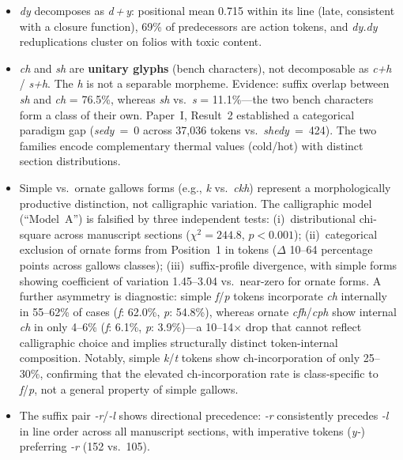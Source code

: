 \documentclass[11pt,a4paper]{article}
\begin{document}
\begin{itemize}[leftmargin=2em]
\item \textit{dy} decomposes as \textit{d\,+\,y}: positional mean 0.715 within its line (late, consistent with a closure function), 69\% of predecessors are action tokens, and \textit{dy.dy} reduplications cluster on folios with toxic content.

\item \textit{ch} and \textit{sh} are \textbf{unitary glyphs} (bench characters), not decomposable as \textit{c+h} / \textit{s+h}. The \textit{h} is not a separable morpheme. Evidence: suffix overlap between \textit{sh} and \textit{ch} = 76.5\%, whereas \textit{sh} vs.\ \textit{s} = 11.1\%---the two bench characters form a class of their own. Paper~I, Result~2 established a categorical paradigm gap (\textit{sedy}~=~0 across 37,036 tokens vs.\ \textit{shedy}~=~424). The two families encode complementary thermal values (cold/hot) with distinct section distributions.

\item Simple vs.\ ornate gallows forms (e.g., \textit{k} vs.\ \textit{ckh}) represent a morphologically productive distinction, not calligraphic variation. The calligraphic model (``Model~A'') is falsified by three independent tests: (i)~distributional chi-square across manuscript sections ($\chi^2 = 244.8$, $p < 0.001$); (ii)~categorical exclusion of ornate forms from Position~1 in tokens ($\Delta$ 10--64 percentage points across gallows classes); (iii)~suffix-profile divergence, with simple forms showing coefficient of variation 1.45--3.04 vs.\ near-zero for ornate forms. A further asymmetry is diagnostic: simple \textit{f}/\textit{p} tokens incorporate \textit{ch} internally in 55--62\% of cases (\textit{f}: 62.0\%, \textit{p}: 54.8\%), whereas ornate \textit{cfh}/\textit{cph} show internal \textit{ch} in only 4--6\% (\textit{f}: 6.1\%, \textit{p}: 3.9\%)---a 10--14$\times$ drop that cannot reflect calligraphic choice and implies structurally distinct token-internal composition. Notably, simple \textit{k}/\textit{t} tokens show ch-incorporation of only 25--30\%, confirming that the elevated ch-incorporation rate is class-specific to \textit{f}/\textit{p}, not a general property of simple gallows.

\item The suffix pair \textit{-r}/\textit{-l} shows directional precedence: \textit{-r} consistently precedes \textit{-l} in line order across all manuscript sections, with imperative tokens (\textit{y-}) preferring \textit{-r} (152 vs.\ 105).


\end{itemize}
\end{document}
